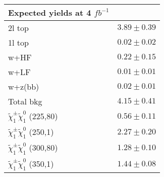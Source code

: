 \begin{table}
\begin{center}
\begin{tabular}{lc}
Expected yields at 4 $fb^{-1}$ & \\
\hline
\hline
2l top&$3.89\pm0.39$\\
1l top&$0.02\pm0.02$\\
w+HF&$0.22\pm0.15$\\
w+LF&$0.01\pm0.01$\\
w+z(bb)&$0.02\pm0.01$\\
\hline
Total bkg&$4.15\pm0.41$\\
\hline
$\tilde{\chi}_{1}^{\pm}\tilde{\chi}_{1}^{0}$ (225,80)&$0.56\pm0.11$\\
$\tilde{\chi}_{1}^{\pm}\tilde{\chi}_{1}^{0}$ (250,1)&$2.27\pm0.20$\\
$\tilde{\chi}_{1}^{\pm}\tilde{\chi}_{1}^{0}$ (300,80)&$1.28\pm0.10$\\
$\tilde{\chi}_{1}^{\pm}\tilde{\chi}_{1}^{0}$ (350,1)&$1.44\pm0.08$\\
\hline
\hline
\end{tabular}
\end{center}
\end{table}
